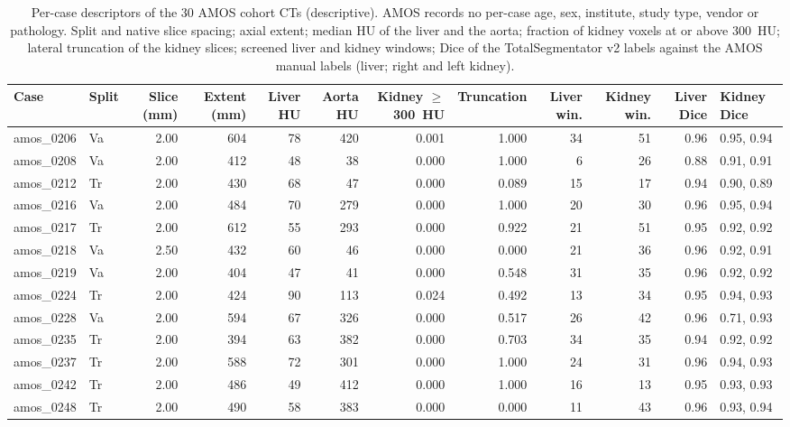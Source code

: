 
\begin{table}[tp]
\renewcommand{\baselinestretch}{1}\scriptsize
\caption{Per-case descriptors of the 30 AMOS cohort CTs (descriptive). AMOS records no per-case age, sex, institute, study type, vendor or pathology. Split and native slice spacing; axial extent; median HU of the liver and the aorta; fraction of kidney voxels at or above 300~HU; lateral truncation of the kidney slices; screened liver and kidney windows; Dice of the TotalSegmentator v2 labels against the AMOS manual labels (liver; right and left kidney).}
\label{tab:s11-amos-cases}
\centering
\setlength{\tabcolsep}{3pt}
\begin{tabularx}{\textwidth}{@{}l l r r r r r r r r r l@{}}
\toprule
Case & Split & Slice (mm) & Extent (mm) & Liver HU & Aorta HU & Kidney $\ge$300~HU & Truncation & Liver win. & Kidney win. & Liver Dice & Kidney Dice \\
\midrule
amos\_0206 & Va & 2.00 & 604 & 78 & 420 & 0.001 & 1.000 & 34 & 51 & 0.96 & 0.95, 0.94 \\
amos\_0208 & Va & 2.00 & 412 & 48 & 38 & 0.000 & 1.000 & 6 & 26 & 0.88 & 0.91, 0.91 \\
amos\_0212 & Tr & 2.00 & 430 & 68 & 47 & 0.000 & 0.089 & 15 & 17 & 0.94 & 0.90, 0.89 \\
amos\_0216 & Va & 2.00 & 484 & 70 & 279 & 0.000 & 1.000 & 20 & 30 & 0.96 & 0.95, 0.94 \\
amos\_0217 & Tr & 2.00 & 612 & 55 & 293 & 0.000 & 0.922 & 21 & 51 & 0.95 & 0.92, 0.92 \\
amos\_0218 & Va & 2.50 & 432 & 60 & 46 & 0.000 & 0.000 & 21 & 36 & 0.96 & 0.92, 0.91 \\
amos\_0219 & Va & 2.00 & 404 & 47 & 41 & 0.000 & 0.548 & 31 & 35 & 0.96 & 0.92, 0.92 \\
amos\_0224 & Tr & 2.00 & 424 & 90 & 113 & 0.024 & 0.492 & 13 & 34 & 0.95 & 0.94, 0.93 \\
amos\_0228 & Va & 2.00 & 594 & 67 & 326 & 0.000 & 0.517 & 26 & 42 & 0.96 & 0.71, 0.93 \\
amos\_0235 & Tr & 2.00 & 394 & 63 & 382 & 0.000 & 0.703 & 34 & 35 & 0.94 & 0.92, 0.92 \\
amos\_0237 & Tr & 2.00 & 588 & 72 & 301 & 0.000 & 1.000 & 24 & 31 & 0.96 & 0.94, 0.93 \\
amos\_0242 & Tr & 2.00 & 486 & 49 & 412 & 0.000 & 1.000 & 16 & 13 & 0.95 & 0.93, 0.93 \\
amos\_0248 & Tr & 2.00 & 490 & 58 & 383 & 0.000 & 0.000 & 11 & 43 & 0.96 & 0.93, 0.94 \\

\end{tabularx}
\end{table}

